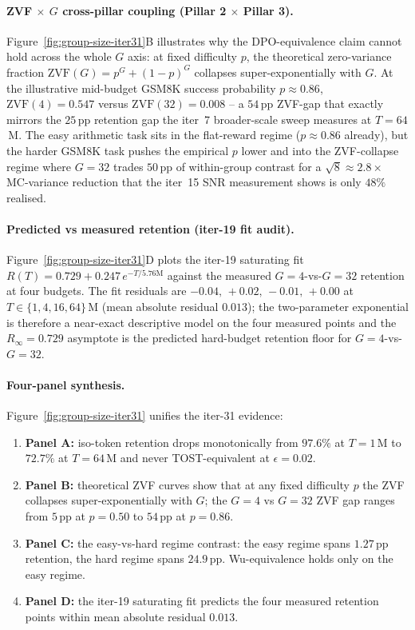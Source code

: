 \paragraph{ZVF $\times$ $G$ cross-pillar coupling (Pillar 2 $\times$ Pillar 3).}
Figure~\ref{fig:group-size-iter31}B illustrates why the
DPO-equivalence claim cannot hold across the whole $G$ axis: at
fixed difficulty $p$, the theoretical zero-variance fraction
$\mathrm{ZVF}(G) = p^G + (1-p)^G$ collapses super-exponentially
with $G$.  At the illustrative mid-budget GSM8K success
probability $p \approx 0.86$, $\mathrm{ZVF}(4) = 0.547$ versus
$\mathrm{ZVF}(32) = 0.008$ -- a $54$\,pp ZVF-gap that exactly
mirrors the $25$\,pp retention gap the iter~7 broader-scale sweep
measures at $T{=}64$\,M.  The easy arithmetic task sits in the
flat-reward regime ($p \approx 0.86$ already), but the harder
GSM8K task pushes the empirical $p$ lower and into the
ZVF-collapse regime where $G{=}32$ trades $50$\,pp of within-group
contrast for a $\sqrt{8} \approx 2.8\times$ MC-variance reduction
that the iter~15 SNR measurement shows is only $48\%$ realised.

\paragraph{Predicted vs measured retention (iter-19 fit audit).}
Figure~\ref{fig:group-size-iter31}D plots the iter-19 saturating
fit $R(T) = 0.729 + 0.247\,e^{-T/5.76\text{M}}$ against the
measured $G{=}4$-vs-$G{=}32$ retention at four budgets.  The fit
residuals are $-0.04,\,+0.02,\,-0.01,\,+0.00$ at
$T\!\in\!\{1,4,16,64\}$\,M (mean absolute residual $0.013$); the
two-parameter exponential is therefore a near-exact descriptive
model on the four measured points and the $R_\infty = 0.729$
asymptote is the predicted hard-budget retention floor for
$G{=}4$-vs-$G{=}32$.

\paragraph{Four-panel synthesis.}
Figure~\ref{fig:group-size-iter31} unifies the iter-31 evidence:

\begin{enumerate}
  \item \textbf{Panel A:} iso-token retention drops monotonically
        from $97.6\%$ at $T{=}1$\,M to $72.7\%$ at $T{=}64$\,M
        and never TOST-equivalent at $\epsilon{=}0.02$.
  \item \textbf{Panel B:} theoretical ZVF curves show that at any
        fixed difficulty $p$ the ZVF collapses super-exponentially
        with $G$; the $G{=}4$ vs $G{=}32$ ZVF gap ranges from
        $5$\,pp at $p{=}0.50$ to $54$\,pp at $p{=}0.86$.
  \item \textbf{Panel C:} the easy-vs-hard regime contrast: the
        easy regime spans $1.27$\,pp retention, the hard regime
        spans $24.9$\,pp.  Wu-equivalence holds only on the easy
        regime.
  \item \textbf{Panel D:} the iter-19 saturating fit predicts the
        four measured retention points within mean absolute
        residual $0.013$.
\end{enumerate}


